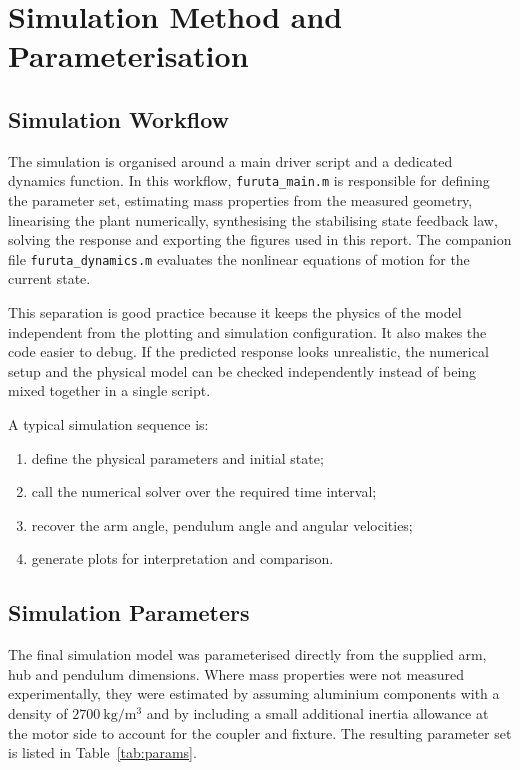 \documentclass[conference]{IEEEtran}
\begin{document}
\section{Simulation Method and Parameterisation}
\subsection{Simulation Workflow}
The simulation is organised around a main driver script and a dedicated dynamics function. In this workflow, \texttt{furuta\_main.m} is responsible for defining the parameter set, estimating mass properties from the measured geometry, linearising the plant numerically, synthesising the stabilising state feedback law, solving the response and exporting the figures used in this report. The companion file \texttt{furuta\_dynamics.m} evaluates the nonlinear equations of motion for the current state.

This separation is good practice because it keeps the physics of the model independent from the plotting and simulation configuration. It also makes the code easier to debug. If the predicted response looks unrealistic, the numerical setup and the physical model can be checked independently instead of being mixed together in a single script.

A typical simulation sequence is:
\begin{enumerate}
\item define the physical parameters and initial state;
\item call the numerical solver over the required time interval;
\item recover the arm angle, pendulum angle and angular velocities;
\item generate plots for interpretation and comparison.
\end{enumerate}

\subsection{Simulation Parameters}
The final simulation model was parameterised directly from the supplied arm, hub and pendulum dimensions. Where mass properties were not measured experimentally, they were estimated by assuming aluminium components with a density of $2700~\mathrm{kg/m^3}$ and by including a small additional inertia allowance at the motor side to account for the coupler and fixture. The resulting parameter set is listed in Table~\ref{tab:params}.
\end{document}
